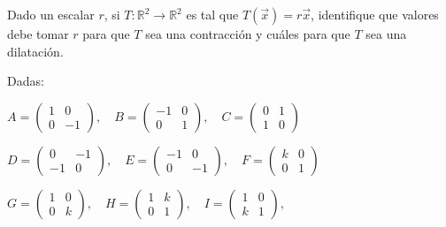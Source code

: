\newpage
\begin{exercise}
\item

Dado un escalar $r$, si $T:\mathbb{R}^2 \rightarrow \mathbb{R}^2$ es tal que $T(\vec{x})=r\vec{x}$, identifique que valores debe tomar $r$ para que $T$ sea una contracción y cuáles para que $T$ sea una dilatación.

\end{exercise}
\begin{exercise}
\item
Dadas:

\bigskip

$A=\left(\begin{array}{cc}1& 0 \\0 & -1
\end{array}
\right), \quad B=\left(\begin{array}{cc}-1& 0 \\0 & 1
\end{array}
\right), \quad C=\left(\begin{array}{cc}0& 1 \\1 & 0
\end{array}
\right)$

\bigskip

$     D=\left(\begin{array}{cc}0& -1 \\-1 & 0
\end{array}
\right), \quad  E=\left(\begin{array}{cc}-1& 0 \\0 & -1
\end{array}
\right),\quad F=\left(\begin{array}{cc} k & 0 \\0 & 1
\end{array}
\right)$ 



$ G=\left(\begin{array}{cc} 1& 0 \\0 & k
\end{array}
\right),\quad H=\left(\begin{array}{cc} 1& k \\0 & 1
\end{array}
\right), \quad    I=\left(\begin{array}{cc} 1& 0 \\k & 1
\end{array}
\right),$


\bigskip


\end{exercise}
